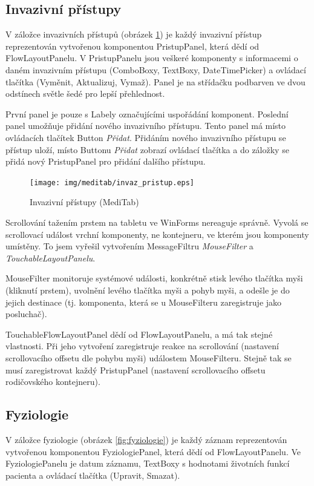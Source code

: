 \subsection{Invazivní přístupy}
\label{ch:pristup}

V záložce invazivních přístupů (obrázek \ref{fig:invaz_pristup}) je každý invazivní přístup reprezentován vytvořenou komponentou PristupPanel, která dědí od FlowLayoutPanelu. V PristupPanelu jsou veškeré komponenty s informacemi o daném invazivním přístupu (ComboBoxy, TextBoxy, DateTimePicker) a ovládací tlačítka (Vyměnit, Aktualizuj, Vymaž). Panel je na střídačku podbarven ve dvou odstínech světle šedé pro lepší přehlednost.

První panel je pouze s Labely označujícími uspořádání komponent. Poslední panel umožňuje přidání nového invazivního přístupu. Tento panel má místo ovládacích tlačítek Button \emph{Přidat}. Přidáním nového invazivního přístupu se přístup uloží, místo Buttonu \emph{Přidat} zobrazí ovládací tlačítka a do záložky se přidá nový PristupPanel pro přidání dalšího přístupu.

\begin{figure}[H]
	\centering
	\texttt{[image: img/meditab/invaz\_pristup.eps]}
	\caption{Invazivní přístupy (MediTab)}
  \label{fig:invaz_pristup}
\end{figure}

Scrollování tažením prstem na tabletu ve WinForms nereaguje správně. Vyvolá se scrollovací událost vrchní komponenty, ne kontejneru, ve kterém jsou komponenty umístěny. To jsem vyřešil vytvořením MessageFiltru \emph{MouseFilter} a \emph{TouchableLayoutPanelu}.

MouseFilter monitoruje systémové události, konkrétně stisk levého tlačítka myši (kliknutí prstem), uvolnění levého tlačítka myši a pohyb myši, a odešle je do jejich destinace (tj. komponenta, která se u MouseFilteru zaregistruje jako posluchač). 

TouchableFlowLayoutPanel dědí od FlowLayoutPanelu, a má tak stejné vlastnosti. Při jeho vytvoření zaregistruje reakce na scrollování (nastavení scrollovacího offsetu dle pohybu myši) událostem MouseFilteru. Stejně tak se musí zaregistrovat každý PristupPanel (nastavení scrollovacího offsetu rodičovského kontejneru).


\subsection{Fyziologie}

V záložce fyziologie (obrázek \ref{fig:fyziologie}) je každý záznam reprezentován vytvořenou komponentou FyziologiePanel, která dědí od FlowLayoutPanelu. Ve FyziologiePanelu je datum záznamu, TextBoxy s hodnotami životních funkcí pacienta a ovládací tlačítka (Upravit, Smazat).

